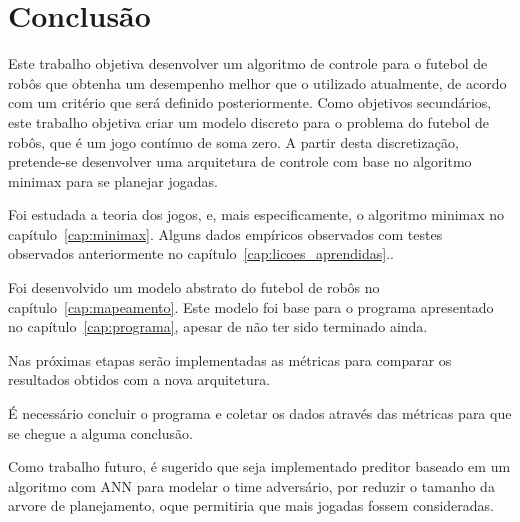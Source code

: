 \chapter{Conclusão}\label{cap:conclusao}

Este trabalho objetiva desenvolver um algoritmo de controle para o futebol
de robôs que obtenha um desempenho melhor que o utilizado atualmente, de acordo
com um critério que será definido posteriormente.
Como objetivos secundários, este trabalho objetiva criar um modelo discreto para
o problema do futebol de robôs, que é um jogo contínuo de soma zero.
A partir desta discretização, pretende-se desenvolver uma arquitetura de
controle com base no algoritmo minimax para se planejar jogadas.

Foi estudada a teoria dos jogos, e, mais especificamente, o algoritmo minimax
no capítulo~\ref{cap:minimax}. Alguns dados empíricos observados com testes
observados anteriormente no capítulo~\ref{cap:licoes_aprendidas}..

Foi desenvolvido um modelo abstrato do futebol de robôs no
capítulo~\ref{cap:mapeamento}. Este modelo foi base para o programa apresentado
no capítulo~\ref{cap:programa}, apesar de não ter sido terminado ainda.

Nas próximas etapas serão implementadas as métricas para comparar os resultados
obtidos com a nova arquitetura.

É necessário concluir o programa e coletar os dados através das métricas para
que se chegue a alguma conclusão.

Como trabalho futuro, é sugerido que seja implementado preditor baseado em
um algoritmo com ANN para modelar o time adversário, por reduzir o tamanho da
arvore de planejamento, oque permitiria que mais jogadas fossem consideradas.
